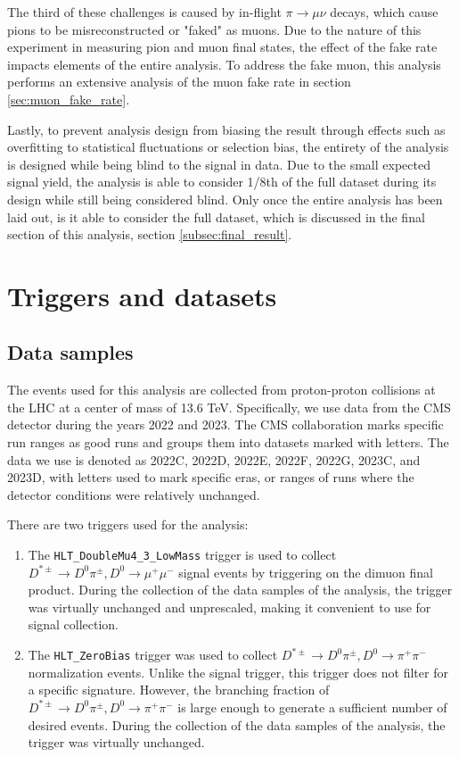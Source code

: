The third of these challenges is caused by in-flight $\pi \to \mu \nu$ decays, which cause pions to be misreconstructed or "faked" as muons. Due to the nature of this experiment in measuring pion and muon final states, the effect of the fake rate impacts elements of the entire analysis. To address the fake muon, this analysis performs an extensive analysis of the muon fake rate in section \ref{sec:muon_fake_rate}. 

Lastly, to prevent analysis design from biasing the result through effects such as overfitting to statistical fluctuations or selection bias, the entirety of the analysis is designed while being blind to the signal in data. Due to the small expected signal yield, the analysis is able to consider 1/8th of the full dataset during its design while still being considered blind. Only once the entire analysis has been laid out, is it able to consider the full dataset, which is discussed in the final section of this analysis, section \ref{subsec:final_result}. 

\section{Triggers and datasets}
\label{sec:triggers_and_datasets}

\subsection{Data samples}

\label{subsec:data_samples}

The events used for this analysis are collected from proton-proton collisions at the LHC at a center of mass of 13.6 TeV. Specifically, we use data from the CMS detector during the years 2022 and 2023. The CMS collaboration marks specific run ranges as good runs and groups them into datasets marked with letters. The data we use is denoted as 2022C, 2022D, 2022E, 2022F, 2022G, 2023C, and 2023D, with letters used to mark specific eras, or ranges of runs where the detector conditions were relatively unchanged. 

There are two triggers used for the analysis:
\begin{enumerate}
    \item The \texttt{HLT\_DoubleMu4\_3\_LowMass} trigger is used to collect $D^{*\pm} \to D^0 \pi^\pm, D^0 \to \mu^+ \mu^-$ signal events by triggering on the dimuon final product. During the collection of the data samples of the analysis, the trigger was virtually unchanged and unprescaled, making it convenient to use for signal collection.
    \item The \texttt{HLT\_ZeroBias} trigger was used to collect $D^{*\pm} \to D^0 \pi^\pm, D^0 \to \pi^+ \pi^-$ normalization events. Unlike the signal trigger, this trigger does not filter for a specific signature. However, the branching fraction of $D^{*\pm} \to D^0 \pi^\pm, D^0 \to \pi^+ \pi^-$ is large enough to generate a sufficient number of desired events. During the collection of the data samples of the analysis, the trigger was virtually unchanged.
\end{enumerate}

